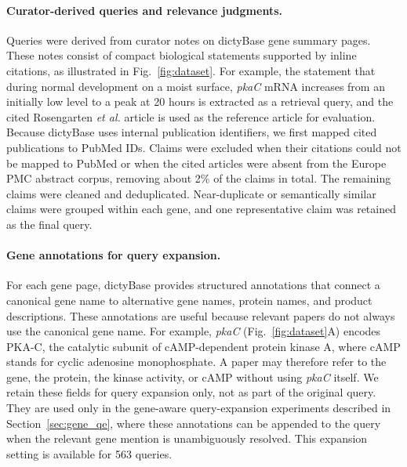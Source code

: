 \documentclass[runningheads]{llncs}
\begin{document}
\paragraph{Curator-derived queries and relevance judgments.}
Queries were derived from curator notes on dictyBase gene summary pages. 
These notes consist of compact biological statements supported by inline citations, as illustrated in Fig.~\ref{fig:dataset}. 
For example, the statement that during normal development on a moist surface, \emph{pkaC} mRNA increases from an initially low level to a peak at 20 hours is extracted as a retrieval query, and the cited Rosengarten \emph{et al.} article is used as the reference article for evaluation.
Because dictyBase uses internal publication identifiers, we first mapped cited publications to PubMed IDs. 
Claims were excluded when their citations could not be mapped to PubMed or when the cited articles were absent from the Europe PMC abstract corpus, removing about 2\% of the claims in total.
The remaining claims were cleaned and deduplicated. 
Near-duplicate or semantically similar claims were grouped within each gene, and one representative claim was retained as the final query. 

\paragraph{Gene annotations for query expansion.}
For each gene page, dictyBase provides structured annotations that connect a canonical gene name to alternative gene names, protein names, and product descriptions. These annotations are useful because relevant papers do not always use the canonical gene name. For example, \emph{pkaC} (Fig.~\ref{fig:dataset}A) encodes PKA-C, the catalytic subunit of cAMP-dependent protein kinase A, where cAMP stands for cyclic adenosine monophosphate. A paper may therefore refer to the gene, the protein, the kinase activity, or cAMP without using \emph{pkaC} itself.
We retain these fields for query expansion only, not as part of the original query.
They are used only in the gene-aware query-expansion experiments described in Section~\ref{sec:gene_qe}, where these annotations can be appended to the query when the relevant gene mention is unambiguously resolved. 
This expansion setting is available for 563 queries.
\end{document}
